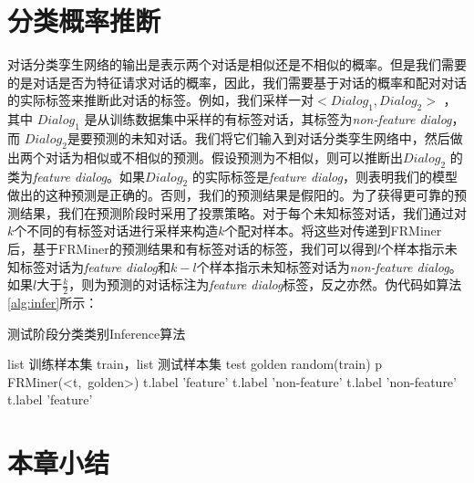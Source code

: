 \section{分类概率推断}
对话分类孪生网络的输出是表示两个对话是相似还是不相似的概率。但是我们需要的是对话是否为特征请求对话的概率，因此，我们需要基于对话的概率和配对对话的实际标签来推断此对话的标签。例如，我们采样一对$<Dialog_1,Dialog_2>$ ，其中 $Dialog_1$ 是从训练数据集中采样的有标签对话，其标签为\textit{non-feature dialog}，而 $Dialog_2$是要预测的未知对话。我们将它们输入到对话分类孪生网络中，然后做出两个对话为相似或不相似的预测。假设预测为不相似，则可以推断出$Dialog_2$ 的类为\textit{feature dialog}。如果$Dialog_2$ 的实际标签是\textit{feature dialog}，则表明我们的模型做出的这种预测是正确的。否则，我们的预测结果是假阳的。为了获得更可靠的预测结果，我们在预测阶段时采用了投票策略。对于每个未知标签对话，我们通过对$k$个不同的有标签对话进行采样来构造$k$个配对样本。将这些对传递到FRMiner后，基于FRMiner的预测结果和有标签对话的标签，我们可以得到$l$个样本指示未知标签对话为\textit{feature dialog}和$k-l$个样本指示未知标签对话为\textit{non-feature dialog}。如果$l$大于$\frac{k}{2}$，则为预测的对话标注为\textit{feature dialog}标签，反之亦然。伪代码如算法\ref{alg:infer}所示：
    \begin{algorithm}[htbp]
            \caption{测试阶段分类类别Inference算法}  
            \label{alg:infer}
            \begin{algorithmic}[1]
                \Require list 训练样本集 train，list 测试样本集 test
                    \State golden \gets random(train)
                    \State p \gets FRMiner(<t,\ golden>)
                        \State t.label \gets 'feature'
                        \EndIf
                        \State t.label \gets 'non-feature'
                        \EndIf
                    \EndIf
                        \State t.label \gets 'non-feature'
                        \EndIf
                        \State t.label \gets 'feature'
                        \EndIf
                    \EndIf
                    \EndFor
                \EndFunction  
            \end{algorithmic}  
    \end{algorithm}
\section{本章小结}